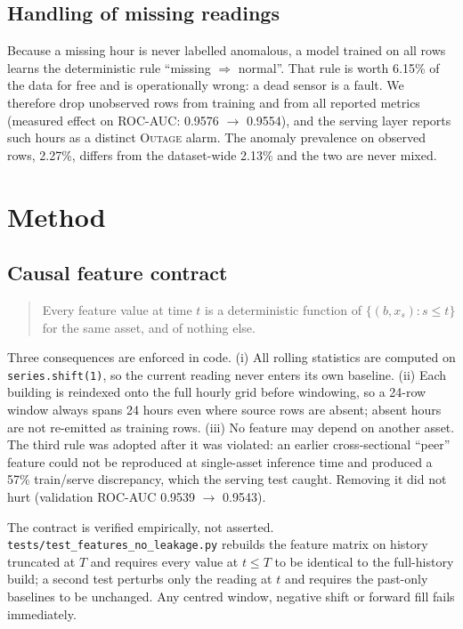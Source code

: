 \documentclass[conference]{IEEEtran}
\begin{document}
\subsection{Handling of missing readings}
\label{sec:missing}

Because a missing hour is never labelled anomalous, a model trained on all rows learns the
deterministic rule ``missing $\Rightarrow$ normal''. That rule is worth 6.15\% of the data for free and
is operationally wrong: a dead sensor is a fault. We therefore drop unobserved rows from training and
from all reported metrics (measured effect on ROC-AUC: 0.9576 $\rightarrow$ 0.9554), and the serving
layer reports such hours as a distinct \textsc{Outage} alarm. The anomaly prevalence on observed rows,
2.27\%, differs from the dataset-wide 2.13\% and the two are never mixed.

\section{Method}
\label{sec:method}

\subsection{Causal feature contract}

\begin{quote}
Every feature value at time $t$ is a deterministic function of
$\{(b, x_s) : s \le t\}$ for the same asset, and of nothing else.
\end{quote}

Three consequences are enforced in code. (i) All rolling statistics are computed on
\texttt{series.shift(1)}, so the current reading never enters its own baseline. (ii) Each building is
reindexed onto the full hourly grid before windowing, so a 24-row window always spans 24 hours even
where source rows are absent; absent hours are not re-emitted as training rows. (iii) No feature may
depend on another asset. The third rule was adopted after it was violated: an earlier cross-sectional
``peer'' feature could not be reproduced at single-asset inference time and produced a 57\%
train/serve discrepancy, which the serving test caught. Removing it did not hurt
(validation ROC-AUC 0.9539 $\rightarrow$ 0.9543).

The contract is verified empirically, not asserted. \texttt{tests/test\_features\_no\_leakage.py}
rebuilds the feature matrix on history truncated at $T$ and requires every value at $t \le T$ to be
identical to the full-history build; a second test perturbs only the reading at $t$ and requires the
past-only baselines to be unchanged. Any centred window, negative shift or forward fill fails
immediately.
\end{document}
